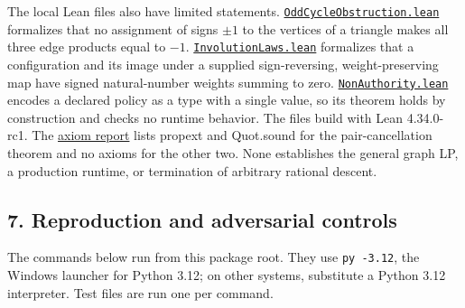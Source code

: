 \documentclass[
  11pt,
]{article}
\newcommand{\passthrough}[1]{#1}
\begin{document}
The local Lean files also have limited statements.
\href{https://github.com/dbccpage/the_symbol_game/blob/main/omega_engine_education/documentation/030_pfp_proposal_fidelity_protocol_pfp/papers/omega_engine_symbol_game/001_pfp_discrete_cochain_retraction_and_toy_involutions/lean4/OddCycleObstruction.lean}{\mbox{\nolinkurl{OddCycleObstruction.lean}}}
formalizes that no assignment of signs \(\pm1\) to the vertices of a
triangle makes all three edge products equal to \(-1\).
\href{https://github.com/dbccpage/the_symbol_game/blob/main/omega_engine_education/documentation/030_pfp_proposal_fidelity_protocol_pfp/papers/omega_engine_symbol_game/001_pfp_discrete_cochain_retraction_and_toy_involutions/lean4/InvolutionLaws.lean}{\mbox{\nolinkurl{InvolutionLaws.lean}}}
formalizes that a configuration and its image under a supplied
sign-reversing, weight-preserving map have signed natural-number weights
summing to zero.
\href{https://github.com/dbccpage/the_symbol_game/blob/main/omega_engine_education/documentation/030_pfp_proposal_fidelity_protocol_pfp/papers/omega_engine_symbol_game/001_pfp_discrete_cochain_retraction_and_toy_involutions/lean4/NonAuthority.lean}{\mbox{\nolinkurl{NonAuthority.lean}}}
encodes a declared policy as a type with a single value, so its theorem
holds by construction and checks no runtime behavior. The files build
with Lean 4.34.0-rc1. The
\href{https://github.com/dbccpage/the_symbol_game/blob/main/omega_engine_education/documentation/030_pfp_proposal_fidelity_protocol_pfp/papers/omega_engine_symbol_game/001_pfp_discrete_cochain_retraction_and_toy_involutions/lean4/axiom_report.txt}{axiom
report} lists propext and Quot.sound for the pair-cancellation theorem
and no axioms for the other two. None establishes the general graph LP,
a production runtime, or termination of arbitrary rational descent.

\subsection{7. Reproduction and adversarial
controls}\label{reproduction-and-adversarial-controls}

The commands below run from this package root. They use
\passthrough{\lstinline!py -3.12!}, the Windows launcher for Python
3.12; on other systems, substitute a Python 3.12 interpreter. Test files
are run one per command.
\end{document}
